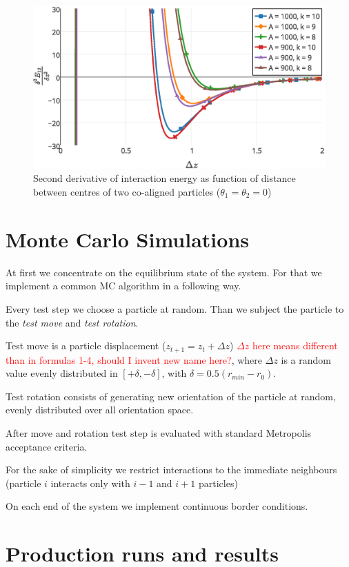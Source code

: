 \documentclass[12pt,a4paper]{article}
\begin{document}
\begin{figure}[h]
	\centering
	\includegraphics[width=.6\textwidth]{Energy_deriv2_r_difAK}
	\captionsetup{justification=centering, width=0.8\textwidth}
	\caption{Second derivative of interaction energy as function of distance between centres of two co-aligned particles ($\theta_1 = \theta_2 = 0$)}
	\label{fig:energy_second_derivative}
\end{figure}

\section{Monte Carlo Simulations}

At first we concentrate on the equilibrium state of the system. For that we implement a common MC algorithm in a following way.

Every test step we choose a particle at random. Than we subject the particle to the \emph{test move} and \emph{test rotation}.

Test move is a particle displacement ($z_{t+1} = z_t + \Delta z$) \textcolor{red}{$\Delta z$ here means different than in formulas 1-4, should I invent new name here?}, where $\Delta z$ is a random value evenly distributed in $[+\delta, -\delta]$, with $\delta = 0.5 (r_{min} - r_0)$. 

Test rotation consists of generating new orientation of the particle at random, evenly distributed over all orientation space.

After move and rotation test step is evaluated with standard Metropolis acceptance criteria.

For the sake of simplicity we restrict interactions to the immediate neighbours (particle $i$ interacts only with $i-1$ and $i+1$ particles) 

On each end of the system we implement continuous border conditions.

\section{Production runs and results}
\end{document}
